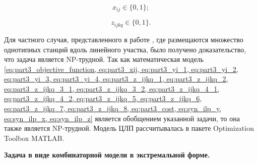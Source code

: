 \begin{equation}
    \label{eq:syn_ilp_x}
    x_{ij} \in \{0, 1\};
\end{equation}

\begin{equation}
    \label{eq:syn_ilp_z}
    z_{ijkq} \in \{0, 1\}.
\end{equation}


Для частного случая, представленного в работе \cite{Ivanov2018}, где размещаются множество однотипных станций вдоль линейного участка, было получено доказательство, что задача является NP-трудной. Так как математическая модель \cref{eq:part3_objective_function, eq:part3_xij, eq:part3_yi_1, eq:part3_yi_2, eq:part3_yi_3, eq:part3_yi_4, eq:part3_z_ijkq_1, eq:part3_z_ijkq_2, eq:part3_z_ijkq_3_1, eq:part3_z_ijkq_3_2, eq:part3_z_ijkq_4_1, eq:part3_z_ijkq_4_2, eq:part3_z_ijkq_5, eq:part3_z_ijkq_6, eq:part3_z_ijkq_7, eq:part3_z_ijkq_8, eq:part3_cost, eq:syn_ilp_y, eq:syn_ilp_x, eq:syn_ilp_z} является обобщением указанной задачи, то  она также является NP-трудной. Модель ЦЛП рассчитывалась в пакете Optimization Toolbox MATLAB.



\textbf{Задача в виде комбинаторной модели в экстремальной форме.}

